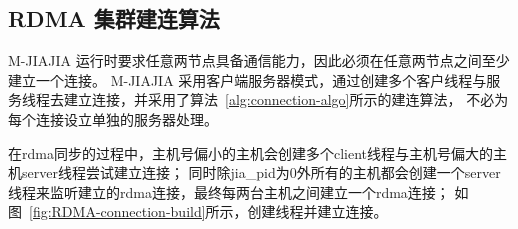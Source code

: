 {    %



    \subsection{RDMA 集群建连算法}

    M-JIAJIA 运行时要求任意两节点具备通信能力，因此必须在任意两节点之间至少建立一个连接。
    M-JIAJIA 采用客户端服务器模式，通过创建多个客户线程与服务线程去建立连接，并采用了算法~\ref{alg:connection-algo}所示的建连算法，
    不必为每个连接设立单独的服务器处理。

    在rdma同步的过程中，主机号偏小的主机会创建多个client线程与主机号偏大的主机server线程尝试建立连接；
    同时除jia\_pid为0外所有的主机都会创建一个server线程来监听建立的rdma连接，最终每两台主机之间建立一个rdma连接；
    如图~\ref{fig:RDMA-connection-build}所示，创建线程并建立连接。

}
